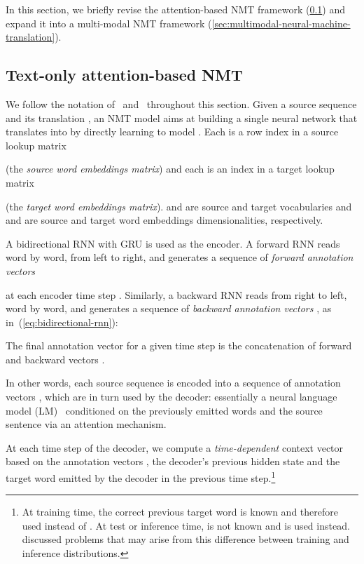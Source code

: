 \documentclass[11pt,twocolumn]{article}
\begin{document}
In this section, we briefly revise the attention-based NMT framework (\cref{sec:text-only-attention-based-neural-machine-translation}) and expand it into a multi-modal NMT framework (\cref{sec:multimodal-neural-machine-translation}).

\subsection{Text-only attention-based NMT}
\label{sec:text-only-attention-based-neural-machine-translation}

We follow the notation of~
and~ throughout this section.
Given a source sequence  and
its translation ,
an NMT model aims at building a single neural network that translates  into 
by directly learning to model .
Each  is a row index in a source lookup matrix

(the \emph{source word embeddings matrix})
and each  is an index in a target lookup matrix

(the \emph{target word embeddings matrix}).
 and  are source and target vocabularies
and  and  are source and target word embeddings dimensionalities,
respectively.

A bidirectional RNN with GRU is used as the encoder.
A forward RNN 
reads  word by word, from left to right,
and generates a sequence of \emph{forward annotation vectors}

at each encoder time step .
Similarly, a backward RNN 
reads 
from right to left,
word by word, and generates a sequence of \emph{backward annotation vectors}
, as in~(\ref{eq:bidirectional-rnn}):

The final annotation vector for a given time step  is the concatenation of forward and backward vectors .


In other words, each source sequence  is encoded into a sequence of annotation vectors , which are in turn used by the decoder: essentially a neural language model (LM)~\cite{Bengioetal2003} conditioned on the previously emitted words and the source sentence via an attention mechanism.

At each time step  of the decoder, we compute a \emph{time-dependent} context vector  based on the annotation vectors , the decoder's previous hidden state  and the target word  emitted by the decoder in the previous time step.\footnote{At training time, the correct previous target word  is known and therefore used instead of .
At test or inference time,  is not known and  is used instead.
 discussed problems that may arise from this difference between training and inference distributions.
}
\end{document}
